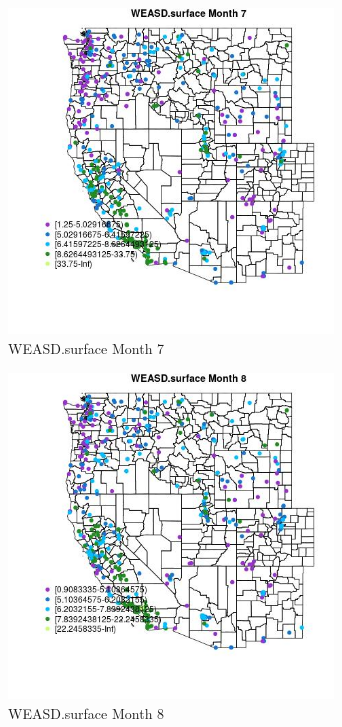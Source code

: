 \begin{figure} 
\centering  
\includegraphics[width=0.77\textwidth]{Code_Outputs/ML_input_report_ML_input_PM25_Step5_part_d_de_duplicated_aves_ML_input_MapObsMo7WEASDsurface.jpg} 
\caption{\label{fig:ML_input_report_ML_input_PM25_Step5_part_d_de_duplicated_aves_ML_inputMapObsMo7WEASDsurface}WEASD.surface Month 7} 
\end{figure} 
 

\begin{figure} 
\centering  
\includegraphics[width=0.77\textwidth]{Code_Outputs/ML_input_report_ML_input_PM25_Step5_part_d_de_duplicated_aves_ML_input_MapObsMo8WEASDsurface.jpg} 
\caption{\label{fig:ML_input_report_ML_input_PM25_Step5_part_d_de_duplicated_aves_ML_inputMapObsMo8WEASDsurface}WEASD.surface Month 8} 
\end{figure} 
 

